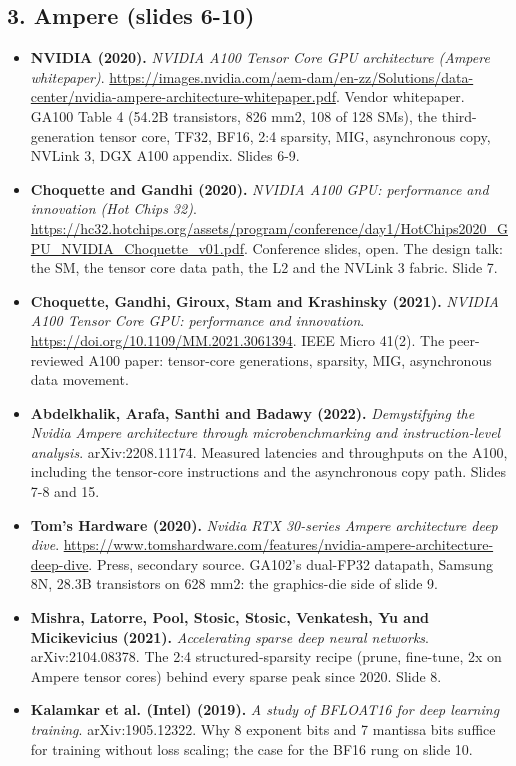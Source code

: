 \subsection*{3. Ampere (slides 6-10)}
\begin{itemize}[leftmargin=1.2em,itemsep=3pt]\sloppy
\item \textbf{NVIDIA (2020).} \textit{NVIDIA A100 Tensor Core GPU architecture (Ampere whitepaper)}. \url{https://images.nvidia.com/aem-dam/en-zz/Solutions/data-center/nvidia-ampere-architecture-whitepaper.pdf}. Vendor whitepaper. GA100 Table 4 (54.2B transistors, 826 mm2, 108 of 128 SMs), the third-generation tensor core, TF32, BF16, 2:4 sparsity, MIG, asynchronous copy, NVLink 3, DGX A100 appendix. Slides 6-9.
\item \textbf{Choquette and Gandhi (2020).} \textit{NVIDIA A100 GPU: performance and innovation (Hot Chips 32)}. \url{https://hc32.hotchips.org/assets/program/conference/day1/HotChips2020_GPU_NVIDIA_Choquette_v01.pdf}. Conference slides, open. The design talk: the SM, the tensor core data path, the L2 and the NVLink 3 fabric. Slide 7.
\item \textbf{Choquette, Gandhi, Giroux, Stam and Krashinsky (2021).} \textit{NVIDIA A100 Tensor Core GPU: performance and innovation}. \url{https://doi.org/10.1109/MM.2021.3061394}. IEEE Micro 41(2). The peer-reviewed A100 paper: tensor-core generations, sparsity, MIG, asynchronous data movement.
\item \textbf{Abdelkhalik, Arafa, Santhi and Badawy (2022).} \textit{Demystifying the Nvidia Ampere architecture through microbenchmarking and instruction-level analysis}. arXiv:2208.11174. Measured latencies and throughputs on the A100, including the tensor-core instructions and the asynchronous copy path. Slides 7-8 and 15.
\item \textbf{Tom's Hardware (2020).} \textit{Nvidia RTX 30-series Ampere architecture deep dive}. \url{https://www.tomshardware.com/features/nvidia-ampere-architecture-deep-dive}. Press, secondary source. GA102's dual-FP32 datapath, Samsung 8N, 28.3B transistors on 628 mm2: the graphics-die side of slide 9.
\item \textbf{Mishra, Latorre, Pool, Stosic, Stosic, Venkatesh, Yu and Micikevicius (2021).} \textit{Accelerating sparse deep neural networks}. arXiv:2104.08378. The 2:4 structured-sparsity recipe (prune, fine-tune, 2x on Ampere tensor cores) behind every sparse peak since 2020. Slide 8.
\item \textbf{Kalamkar et al. (Intel) (2019).} \textit{A study of BFLOAT16 for deep learning training}. arXiv:1905.12322. Why 8 exponent bits and 7 mantissa bits suffice for training without loss scaling; the case for the BF16 rung on slide 10.

\end{itemize}
